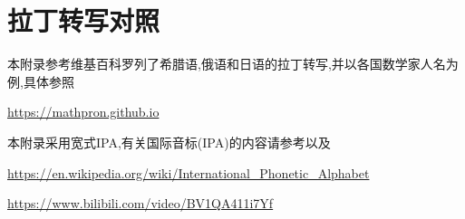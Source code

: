 \chapter{拉丁转写对照}
本附录参考维基百科罗列了希腊语,俄语和日语的拉丁转写,并以各国数学家人名为例,具体参照

\url{https://mathpron.github.io}

本附录采用宽式IPA,有关国际音标(IPA)的内容请参考\cite{LT}以及

\url{https://en.wikipedia.org/wiki/International_Phonetic_Alphabet}

\url{https://www.bilibili.com/video/BV1QA411i7Yf}


